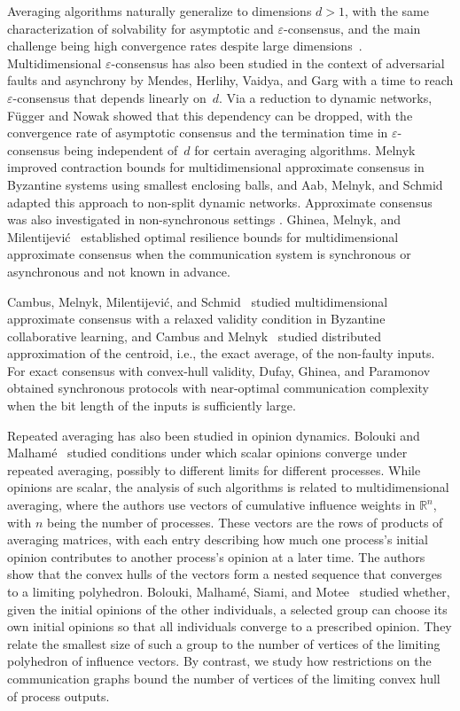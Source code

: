 \documentclass[preprint,12pt,a4paper]{elsarticle}
\theoremstyle{plain}
\theoremstyle{definition}
\newcommand{\IR}{\mathbb{R}}
\begin{document}
Averaging algorithms naturally generalize to dimensions $d > 1$, with the same characterization of solvability for asymptotic and $\varepsilon$-consensus, and the main challenge being high convergence rates despite large dimensions~\cite{CBFN16:centroid,FN18:disc}.
Multidimensional $\varepsilon$-consensus has also been studied in the context of adversarial faults and asynchrony by Mendes, Herlihy, Vaidya, and Garg \cite{mendes15:multidimensional} with a time to reach $\varepsilon$-consensus that depends linearly on~$d$.
Via a reduction to dynamic networks, Függer and Nowak \cite{FN18:disc} showed that this dependency can be dropped, with the convergence rate of asymptotic consensus and the termination time in $\varepsilon$-consensus being independent of~$d$ for certain averaging algorithms.
Melnyk~\cite{Melnyk2026:balls} improved contraction bounds for multidimensional approximate consensus in Byzantine systems using smallest enclosing balls, and Aab, Melnyk, and Schmid~\cite{AabEtAl2026} adapted this approach to non-split dynamic networks.
Approximate consensus was also investigated in non-synchronous settings \cite{attiya2023step,ghinea2023multidimensional}.
Ghinea, Melnyk, and Milentijevi\'c~\cite{GhineaEtAl2026} established optimal resilience bounds for multidimensional approximate consensus when the communication system is synchronous or asynchronous and not known in advance.

Cambus, Melnyk, Milentijevi\'c, and Schmid~\cite{CambusEtAl2025} studied multidimensional approximate consensus with a relaxed validity condition in Byzantine collaborative learning, and Cambus and Melnyk~\cite{CambusMelnyk2026} studied distributed approximation of the centroid, i.e., the exact average, of the non-faulty inputs.
For exact consensus with convex-hull validity, Dufay, Ghinea, and Paramonov~\cite{DufayEtAl2026} obtained synchronous protocols with near-optimal communication complexity when the bit length of the inputs is sufficiently large.

Repeated averaging has also been studied in opinion dynamics.
Bolouki and Malham\'e~\cite{BoloukiMalhame2016} studied conditions under which
  scalar opinions converge under repeated averaging, possibly to different limits for
  different processes.
While opinions are scalar, the analysis of such algorithms is related to multidimensional
  averaging, where the authors use vectors of cumulative
  influence weights in $\IR^n$, with $n$ being the number of processes.
These vectors are the rows of products of averaging matrices,
  with each entry describing how much one process's initial opinion contributes
  to another process's opinion at a later time.
The authors show that the convex hulls of the vectors form a nested sequence that
  converges to a limiting polyhedron.
Bolouki, Malham\'e, Siami, and Motee~\cite{BoloukiEtAl2017} studied whether,
  given the initial opinions of the other individuals, a selected group can choose its
  own initial opinions so that all individuals converge to a prescribed opinion.
They relate the smallest size of such a group to the number of vertices of the
  limiting polyhedron of influence vectors.
By contrast, we study how restrictions on the communication graphs bound the number
  of vertices of the limiting convex hull of process outputs.
\end{document}
